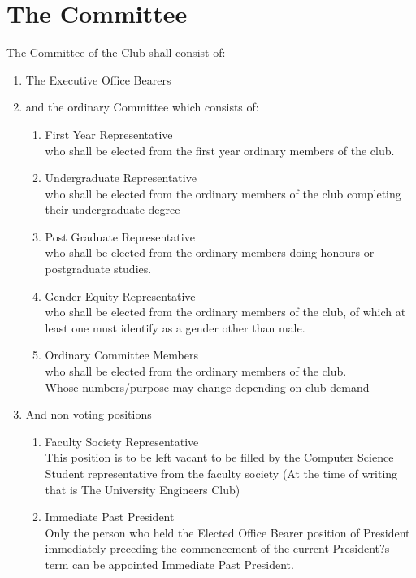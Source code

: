 \documentclass[10pt,a4paper]{report}
\begin{document}
	\section{The Committee}
	The Committee of the Club shall consist of:
	\begin{enumerate}[label=\alph*]
		\item The Executive Office Bearers
		\item and the ordinary Committee which consists of:
		\begin{enumerate}[label=\roman*]
			\item First Year Representative\\
			who shall be elected from the first year ordinary members of the club.
			\item Undergraduate Representative\\
			who shall be elected from the ordinary members of the club completing their undergraduate degree
			\item Post Graduate Representative\\
			who shall be elected from the ordinary members doing honours or postgraduate studies.
			\item Gender Equity Representative\\
			who shall be elected from the ordinary members of the club, of which at least one must identify as a gender other than male.
			\item Ordinary Committee Members\\
			who shall be elected from the ordinary members of the club.\\
			Whose numbers/purpose may change depending on club demand
		\end{enumerate}
		\item And non voting positions
		\begin{enumerate}
			\item Faculty Society Representative\\
			This position is to be left vacant to be filled by the Computer Science Student representative from the faculty society (At the time of writing that is The University Engineers Club)
			\item Immediate Past President\\
			Only the person who held the Elected Office Bearer position of President immediately preceding the commencement of the current President?s term can be appointed Immediate Past President.
		\end{enumerate}
	\end{enumerate}
\end{document}
